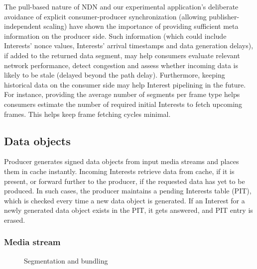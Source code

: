 \documentclass{icn/sig-alternate-2012} %
\begin{document}
The pull-based nature of NDN and our experimental application's deliberate avoidance of explicit consumer-producer synchronization (allowing publisher-independent scaling) have shown the importance of providing sufficient meta information on the producer side. Such information (which could include Interests' nonce values, Interests' arrival timestamps and data generation delays), if added to the returned data segment, may help consumers evaluate relevant network performance, detect congestion and assess whether incoming data is likely to be stale (delayed beyond the path delay). Furthermore, keeping historical data on the consumer side may help Interest pipelining in the future. For instance, providing the average number of segments per frame type helps consumers estimate the number of required initial Interests to fetch upcoming frames. This helps keep frame fetching cycles minimal.


\subsection{Data objects}
Producer generates signed data objects from input media streams and places them in cache instantly. Incoming Interests retrieve data from cache, if it is present, or forward further to the producer, if the requested data has yet to be produced. In such cases, the producer maintains a pending Interests table (PIT), which is checked every time a new data object is generated. If an Interest for a newly generated data object exists in the PIT, it gets answered, and PIT entry is erased.

\subsubsection{Media stream}

\begin{figure}[t!]
\centering


\caption{Segmentation and bundling}

\end{figure}
\end{document}
